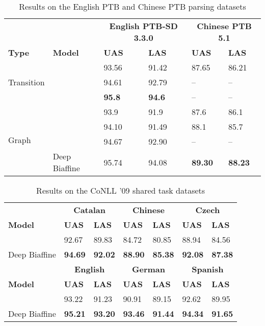 \documentclass[11pt,a4paper]{article}
\begin{document}
\begin{table}
  \begin{center}\small
  \begin{tabular}{llllll}
    && \multicolumn{2}{c}{\bf English PTB-SD 3.3.0} & \multicolumn{2}{c}{\bf Chinese PTB 5.1}\\
    \bf Type & \bf Model & \bf UAS & \bf LAS & \bf UAS & \bf LAS\\[1ex]
    \multirow{3}{*}{Transition} & \citet{Ballesterosetal2016} & 93.56 & 91.42  & 87.65 & 86.21\\
    &\citet{Andoretal2016} & 94.61 & 92.79 & -- & --\\
    &\citet{KuncoroBallesterosetal2016} &\bf 95.8 & \bf 94.6 & -- & --\\[1ex]
    \multirow{4}{*}{Graph} & \citet{KiperwasserGoldberg2016} & 93.9 & 91.9 & 87.6 & 86.1\\
    &\citet{Chengetal2016} & 94.10 & 91.49 & 88.1 & 85.7\\
    &\citet{Hashimotoetal2016} & 94.67 & 92.90 & -- & --\\
    &Deep Biaffine & 95.74 & 94.08 & \bf 89.30 & \bf 88.23
  \end{tabular}
  \end{center}
  \caption{Results on the English PTB and Chinese PTB parsing datasets}
  \label{compare}
\end{table}
\begin{table}
  \begin{center}\small
  \begin{tabular}{lllllll}
    & \multicolumn{2}{c}{\bf Catalan} & \multicolumn{2}{c}{\bf Chinese} & \multicolumn{2}{c}{\bf Czech}\\
    \bf Model & \bf UAS & \bf LAS & \bf UAS & \bf LAS & \bf UAS & \bf LAS \\[1ex]
    \citeauthor{Andoretal2016} & 92.67 & 89.83 & 84.72 & 80.85 & 88.94 & 84.56\\
    Deep Biaffine & \bf 94.69 & \bf 92.02 & \bf 88.90 & \bf 85.38 & \bf 92.08 & \bf 87.38\\[2ex]
    & \multicolumn{2}{c}{\bf English} & \multicolumn{2}{c}{\bf German}& \multicolumn{2}{c}{\bf Spanish}\\
    \bf Model & \bf UAS & \bf LAS & \bf UAS & \bf LAS & \bf UAS & \bf LAS\\[1ex]
    \citeauthor{Andoretal2016} & 93.22 & 91.23 & 90.91 & 89.15 & 92.62 & 89.95\\
    Deep Biaffine & \bf 95.21 & \bf 93.20 & \bf 93.46 & \bf 91.44 & \bf 94.34 & \bf 91.65
  \end{tabular}
  \caption{Results on the CoNLL '09 shared task datasets}
  \end{center}
\end{table}
\end{document}
